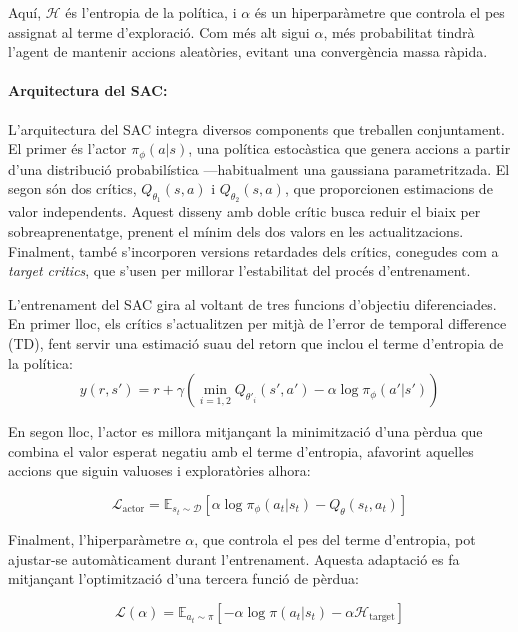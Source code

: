 \documentclass[12pt,a4paper,twoside]{book}
\begin{document}
Aquí, $\mathcal{H}$ és l’entropia de la política, i $\alpha$ és un hiperparàmetre que controla el pes assignat al terme d'exploració. Com més alt sigui $\alpha$, més probabilitat tindrà l’agent de mantenir accions aleatòries, evitant una convergència massa ràpida.

\paragraph{Arquitectura del SAC:}

L’arquitectura del SAC integra diversos components que treballen conjuntament. El primer és l’actor $\pi_\phi(a|s)$, una política estocàstica que genera accions a partir d’una distribució probabilística —habitualment una gaussiana parametritzada. El segon són dos crítics, $Q_{\theta_1}(s,a)$ i $Q_{\theta_2}(s,a)$, que proporcionen estimacions de valor independents. Aquest disseny amb doble crític busca reduir el biaix per sobreaprenentatge, prenent el mínim dels dos valors en les actualitzacions. Finalment, també s’incorporen versions retardades dels crítics, conegudes com a \textit{target critics}, que s’usen per millorar l’estabilitat del procés d'entrenament.


L’entrenament del SAC gira al voltant de tres funcions d’objectiu diferenciades. En primer lloc, els crítics s’actualitzen per mitjà de l’error de temporal difference (TD), fent servir una estimació suau del retorn que inclou el terme d'entropia de la política:
  \begin{equation}
  y(r,s') = r + \gamma \left( \min_{i=1,2} Q_{\theta'_i}(s', a') - \alpha \log \pi_\phi(a'|s') \right)
  \end{equation}

  En segon lloc, l’actor es millora mitjançant la minimització d’una pèrdua que combina el valor esperat negatiu amb el terme d’entropia, afavorint aquelles accions que siguin valuoses i exploratòries alhora:

  \begin{equation}
  \mathcal{L}_{\text{actor}} = \mathbb{E}_{s_t \sim \mathcal{D}} \left[ \alpha \log \pi_\phi(a_t|s_t) - Q_{\theta}(s_t, a_t) \right]
  \end{equation}

  Finalment, l’hiperparàmetre $\alpha$, que controla el pes del terme d'entropia, pot ajustar-se automàticament durant l’entrenament. Aquesta adaptació es fa mitjançant l’optimització d’una tercera funció de pèrdua:

  \begin{equation}
  \mathcal{L}(\alpha) = \mathbb{E}_{a_t \sim \pi} \left[ -\alpha \log \pi(a_t|s_t) - \alpha \mathcal{H}_\text{target} \right]
  \end{equation}
\end{document}
